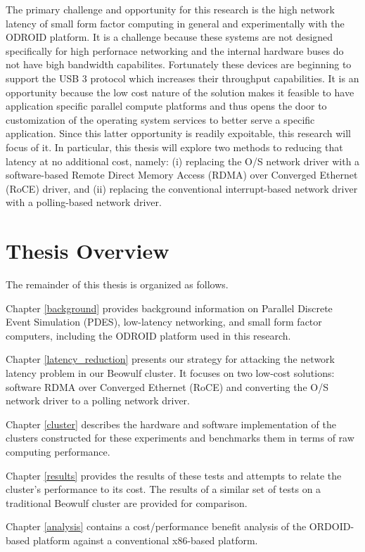\documentclass[11pt]{book}
\begin{document}
The primary challenge and opportunity for this research is the high network latency of
small form factor computing in general and experimentally with the ODROID platform.  It is
a challenge because these systems are not designed specifically for high perfornace
networking and the internal hardware buses do not have bigh bandwidth capabilites.
Fortunately these devices are beginning to support the USB 3 protocol which increases
their throughput capabilities.  It is an opportunity because the low cost nature of the
solution makes it feasible to have application specific parallel compute platforms and
thus opens the door to customization of the operating system services to better serve a
specific application.  Since this latter opportunity is readily expoitable, this research
will focus of it.  In particular, this thesis will explore two methods to reducing that
latency at no additional cost, namely: (i) replacing the O/S network driver with a
software-based Remote Direct Memory Access (RDMA) over Converged Ethernet (RoCE) driver,
and (ii) replacing the conventional interrupt-based network driver with a polling-based
network driver.

\section{\textbf{Thesis Overview}}

The remainder of this thesis is organized as follows.

Chapter \ref{background} provides background information on Parallel Discrete Event
Simulation (PDES), low-latency networking, and small form factor computers, including the
ODROID platform used in this research.

Chapter \ref{latency_reduction} presents our strategy for attacking the network latency
problem in our Beowulf cluster.  It focuses on two low-cost solutions: software RDMA over
Converged Ethernet (RoCE) and converting the O/S network driver to a polling network
driver. 

Chapter \ref{cluster} describes the hardware and software implementation of the clusters
constructed for these experiments and benchmarks them in terms of raw computing
performance.

Chapter \ref{results} provides the results of these tests and attempts to relate the
cluster's performance to its cost.  The results of a similar set of tests on a traditional
Beowulf cluster are provided for comparison.

Chapter \ref{analysis} contains a cost/performance benefit analysis of the ORDOID-based
platform against a conventional x86-based platform.  
\end{document}
